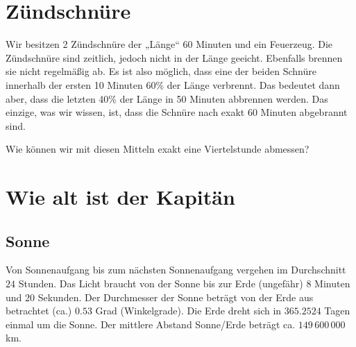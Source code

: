 \section{Zündschnüre}
Wir besitzen 2 Zündschnüre der „Länge“ 60 Minuten und ein Feuerzeug. Die
Zündschnüre sind zeitlich, jedoch nicht in der Länge geeicht. Ebenfalls brennen
sie nicht regelmäßig ab. Es ist also möglich, dass eine der beiden Schnüre
innerhalb der ersten 10 Minuten 60\% der Länge verbrennt. Das bedeutet dann
aber, dass die letzten 40\% der Länge in 50 Minuten abbrennen werden.
Das einzige, was wir wissen, ist, dass die Schnüre nach exakt 60 Minuten
abgebrannt sind.

Wie können wir mit diesen Mitteln exakt eine Viertelstunde abmessen?
\TNTeop{}



\section{Wie alt ist der Kapitän}

\subsection{Sonne}
Von Sonnenaufgang bis zum nächsten Sonnenaufgang vergehen im Durchschnitt
$24$ Stunden. Das Licht braucht von der Sonne bis zur Erde (ungefähr) $8$
Minuten und $20$ Sekunden. Der Durchmesser der Sonne beträgt von der Erde
aus betrachtet (ca.) $0.53$ Grad (Winkelgrade). Die Erde dreht sich in
$365.2524$
Tagen einmal um die Sonne. Der mittlere Abstand Sonne/Erde beträgt ca.
$149\,600\,000$ km.

